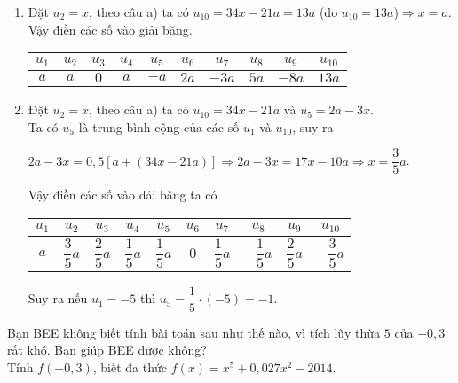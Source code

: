 \begin{vd}
{\begin{enumerate}
\begin{eqnarray*}
				&&u_6=u_4-u_5=(2b-a)-(2a-3b)=5b-3a.\\
				&&u_7=u_5-u_6=(2a-3b)-(5b-3a)=5a-8b.\\
				&&u_8=u_6-u_7=(5b-3a)-(5a-8b)=13b-8a.\\
				&&u_9=u_7-u_8=(5a-8b)-(13b-8a)=13a-21b.\\
				&&u_{10}=u_8-u_9=(13b-8a)-(13a-21b)=34b-21a.
			\end{eqnarray*}
			\item Đặt $u_2=x$, theo câu a) ta có $u_{10}=34x-21a=13a$ (do $u_{10}=13a$)$\Rightarrow x=a$.\\
			Vậy điền các số vào giải băng. 
			\begin{center}
				\begin{tabular}{|c|c|c|c|c|c|c|c|c|c|}
					\hline 
					$u_1$ & $u_2$& $u_3$& $u_4$& $u_5$& $u_6$& $u_7$ & $u_8$& $u_9$  & $u_{10}$\\ 
					\hline 
					$a$ & $a$& $0$& $a$ & $-a$ & $2a$& $-3a$& $5a$ & $-8a$&$13a$\\
					\hline 
				\end{tabular}
			\end{center}
			\item
			 Đặt $u_2=x$, theo câu a) ta có $u_{10}=34x-21a$ và $u_5=2a-3x$. \\
			 Ta có $u_5$ là trung bình cộng của các số $u_1$ và $u_{10}$, suy ra 
			 \begin{center}
			 	$2a-3x=0{,}5[a+(34x-21a)]\Rightarrow 2a-3x=17x-10a\Rightarrow x= \dfrac{3}{5}a$.
			 \end{center}
			 Vậy điền các số vào dải băng ta có
			 \begin{center}
			 	\begin{tabular}{|c|c|c|c|c|c|c|c|c|c|}
			 		\hline 
			 		$u_1$ & $u_2$& $u_3$& $u_4$& $u_5$& $u_6$& $u_7$ & $u_8$& $u_9$  & $u_{10}$\\ 
			 		\hline 
			 		$a$ & $\dfrac{3}{5}a$& $\dfrac{2}{5}a$& $\dfrac{1}{5}a$ & $\dfrac{1}{5}a$ & $0$& $\dfrac{1}{5}a$& $-\dfrac{1}{5}a$ & $\dfrac{2}{5}a$&$-\dfrac{3}{5}a$\\
			 		\hline 
			 	\end{tabular}
			 \end{center}
		 	Suy ra nếu $u_1=-5$ thì $u_5=\dfrac{1}{5}\cdot (-5)=-1$.
 		\end{enumerate}
	}
\end{vd}

\begin{vd}%
	Bạn BEE không biết tính bài toán sau như thế nào, vì tích lũy thừa $5$ của $-0{,}3$ rất khó. Bạn giúp BEE được không?\\
	Tính $f(-0{,}3)$, biết đa thức $f(x)=x^5+0{,}027x^2-2014$.
\end{vd}

